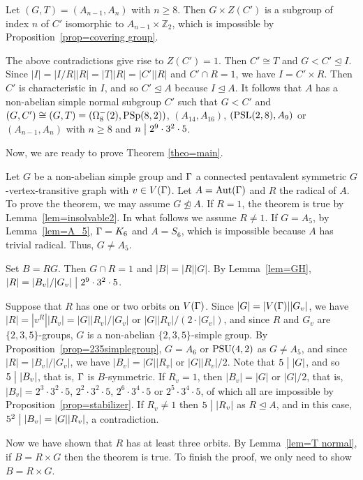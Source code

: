 \documentclass[12pt]{article}
\def\di{\bigm|} \def\lg{\langle} \def\rg{\rangle}
\def\f{\noindent}
\def\PSL{\hbox{\rm PSL}}\def\PSU{\hbox{\rm PSU}}
\def\PSp{\hbox{\rm PSp}}\def\P\GammaL{\hbox{\rm P\Gamma L}} \def\ASIL{\hbox{\rm A\Sigma L}}
\def\Aut{\hbox{\rm Aut}}
\newcommand{\qed}{\mbox{\raisebox{0.7ex}{\fbox{}}} \vspace{4truemm}}
\def\mz{{\mathbb Z}}
\begin{document}
Let $(G,T)=(A_{n-1},A_n)$ with $n\geq 8$. Then $G\times Z(C')$ is a subgroup of index $n$ of $C'$ isomorphic to $A_{n-1}\times \mz_2$, which is impossible by Proposition~\ref{prop=covering group}.

The above contradictions give rise to $Z(C')=1$. Then $C'\cong T$ and $G<C'\unlhd I$.
Since $|I|=|I/R||R|=|T||R|=|C'||R|$ and $C'\cap R=1$, we have $I=C'\times R$. Then $C'$ is characteristic in $I$,
and so $C'\unlhd A$ because $I\unlhd A$. It follows that $A$ has a non-abelian simple normal subgroup $C'$ such that $G< C'$ and $(G,C')\cong (G,T)=(\Omega^-_8(2),\PSp(8,2))$, $(A_{14},A_{16})$, $(\PSL(2,8),A_{9})$ or $(A_{n-1},A_n)$ with $n\geq 8$ and $n\di 2^9\cdot3^2\cdot5$.
\hfill\qed


Now, we are ready to prove Theorem \ref{theo=main}.

\medskip

\f {\bf The proof of Theorem \ref{theo=main}:} Let $G$ be a non-abelian simple group and $\Gamma$ a connected pentavalent
symmetric $G$-vertex-transitive graph with $v\in V(\Gamma)$. Let $A=\Aut(\G)$ and $R$ the radical of $A$. To prove the theorem,
we may assume $G\ntrianglelefteq A$. If $R=1$, the theorem is true by  Lemma~\ref{lem=insolvable2}. In what follows
we assume $R\not=1$. If $G=A_5$, by Lemma~\ref{lem=A_5}, $\Gamma=K_6$ and $A=S_6$, which is impossible because $A$ has trivial radical. Thus, $G\not=A_5$.

Set $B=RG$. Then $G\cap R=1$ and $|B|=|R||G|$. By Lemma~\ref{lem=GH},
$|R|=|B_v|/|G_v|\di 2^9\cdot 3^2\cdot 5$.

Suppose that $R$ has one or two orbits on $V(\Gamma)$. Since $|G|=|V(\Gamma)||G_v|$,
we have $|R|=|v^R||R_v|=|G||R_v|/|G_v|$ or $|G||R_v|/(2\cdot|G_v|)$, and since $R$ and $G_v$ are $\{2,3,5\}$-groups,
$G$ is a non-abelian $\{2,3,5\}$-simple group. By Proposition~\ref{prop=235simplegroup}, $G=A_6$ or $\rm PSU(4,2)$ as $G\neq A_5$, and since $|R|=|B_v|/|G_v|$, we have $|B_v|=|G||R_v|$ or $|G||R_v|/2$. Note that $5\di |G|$, and so $5\di |B_v|$, that is, $\Gamma$ is $B$-symmetric.
If $R_v=1$, then $|B_v|=|G|$ or $|G|/2$, that is, $|B_v|=2^3\cdot 3^2 \cdot 5$, $2^2\cdot 3^2 \cdot 5$,
$2^6\cdot 3^4 \cdot 5$ or $2^5\cdot 3^4 \cdot 5$, of which all are impossible by Proposition~\ref{prop=stabilizer}.
If $R_v\not=1$ then $5\di |R_v|$ as $R\unlhd A$, and in this case, $5^2\di |B_v|=|G||R_v|$, a contradiction.

Now we have shown that $R$ has at least three orbits. By Lemma~\ref{lem=T normal}, if $B=R\times G$ then the theorem is true. To finish the proof, we only need to show $B=R\times G$.
\end{document}
